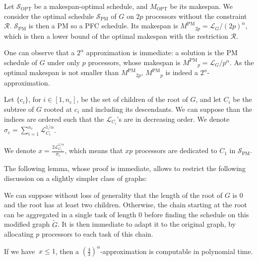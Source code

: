\documentclass{llncs}
\newcommand{\LG}[1]{\mathcal{L}_{#1}}
\newcommand{\spm}{\ensuremath{\mathcal{S}_{\mathrm{PM}}}\xspace}
\newcommand{\mpm}{\ensuremath{M^{\mathrm{PM}}}\xspace}
\newcommand{\sopt}{\ensuremath{\mathcal{S}_{\mathrm{OPT}}}\xspace}
\newcommand{\mopt}{\ensuremath{{M}_{\mathrm{OPT}}}\xspace}
\newcommand{\R}{\ensuremath{\mathcal{R}}\xspace}
\newcommand{\frtrd}{\ensuremath{\left(\frac{4}{3}\right)^\alpha}}
\begin{document}
Let \sopt be a makespan-optimal schedule, and \mopt be its makespan.
We consider the optimal schedule $\spm$ of $G$ on $2p$ processors
without the constraint \R. $\spm$ is then a PM so a PFC schedule. Its
makespan is $\mpm_{2p} = \LG G \big/ (2p)^\alpha$, which is then a
lower bound of the optimal makespan with the restriction \R.

One can observe that a $2^\alpha$ approximation is immediate: a
solution is the PM schedule of $G$ under only $p$ processors, whose
makespan is $\mpm_p = \LG G \big / p^\alpha$. As the optimal makespan
is not smaller than $\mpm_{2p}$, $\mpm_p$ is indeed a
$2^\alpha$-approximation.




Let $\{c_i\}$, for $i\in [1,n_c]$, be the set of children of the root
of $G$, and let $C_i$ be the subtree of $G$ rooted at $c_i$ and
including its descendants. We can suppose than the indices are ordered
such that the $\LG{C_i}$'s are in decreasing order. We denote
$\sigma_c= \sum_{i=1}^{n_c} \LG{C_i}^{1/\alpha}$.

We denote $x=\frac{2\LG{C_1}^{1/\alpha}}{\sigma_c}$, which means that
$xp$ processors are dedicated to $C_1$ in \spm.

The following lemma, whose proof is immediate, allows to restrict the
following discussion on a slightly simpler class of graphs:

\begin{lemma}
\label{lem:chainroot}
We can suppose without loss of generality that the length of the root
of $G$ is $0$ and the root has at least two children. Otherwise, the
chain starting at the root can be aggregated in a single task of
length $0$ before finding the schedule on this modified graph
$\tilde{G}$. It is then immediate to adapt it to the original graph,
by allocating $p$ processors to each task of this chain.
\end{lemma}





\begin{lemma}
\label{lem:x<1}
If we have $\ x \leq 1$, then a $ \frtrd$-approximation is computable in polynomial time.
\end{lemma}
\end{document}
